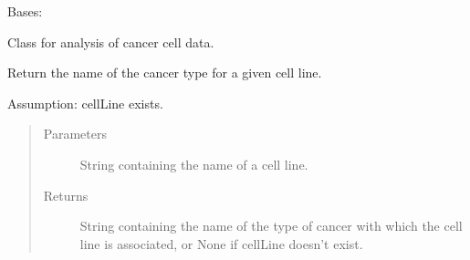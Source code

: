\documentclass[letterpaper,10pt,english]{sphinxmanual}
\begin{document}
\begin{fulllineitems}
\label{\detokenize{CellLineRMAExpression:CellLineRMAExpression.CellLineRMAExpression}}
\sphinxAtStartPar
Bases: 

\sphinxAtStartPar
Class for analysis of cancer cell data.

\begin{fulllineitems}
\label{\detokenize{CellLineRMAExpression:CellLineRMAExpression.CellLineRMAExpression.cancerType}}
\sphinxAtStartPar
Return the name of the cancer type for a given cell line.

\sphinxAtStartPar
Assumption: cellLine exists.
\begin{quote}\begin{description}
\item[{Parameters}] \leavevmode
\sphinxAtStartPar
{} \textendash{} String containing the name of a cell line.

\item[{Returns}] \leavevmode
\sphinxAtStartPar
String containing the name of the type of cancer with which the cell line is associated, or None if cellLine doesn’t exist.

\end{description}\end{quote}

\begin{sphinxVerbatim}[commandchars=\\\{\}]
\end{sphinxVerbatim}

\end{fulllineitems}


\end{fulllineitems}
\end{document}
